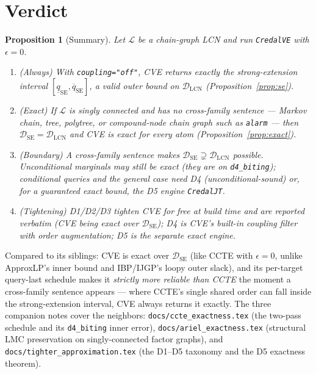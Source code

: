 \documentclass[11pt]{article}
\newtheorem{proposition}{Proposition}
\newcommand{\lo}{\underline}
\newcommand{\hi}{\overline}
\newcommand{\DSE}{\mathcal{D}_{\mathrm{SE}}}
\newcommand{\DLCN}{\mathcal{D}_{\mathrm{LCN}}}
\newcommand{\CVE}{\texttt{CredalVE}}
\begin{document}
\section{Verdict}\label{sec:verdict}

\begin{proposition}[Summary]\label{prop:verdict}
Let $\mathcal L$ be a chain-graph LCN and run \CVE{} with $\epsilon=0$.
\begin{enumerate}
  \item (\emph{Always}) With \texttt{coupling="off"}, CVE returns exactly the strong-extension
    interval $[\lo q_{\mathrm{SE}},\hi q_{\mathrm{SE}}]$, a valid outer bound on $\DLCN$
    (Proposition~\ref{prop:se}).
  \item (\emph{Exact}) If $\mathcal L$ is singly connected and has no cross-family sentence --- Markov
    chain, tree, polytree, or compound-node chain graph such as \texttt{alarm} --- then
    $\DSE=\DLCN$ and CVE is exact for every atom (Proposition~\ref{prop:exact}).
  \item (\emph{Boundary}) A cross-family sentence makes $\DSE\supsetneq\DLCN$ possible. Unconditional
    marginals may still be exact (they are on \texttt{d4\_biting}); conditional queries and the
    general case need D4 (unconditional-sound) or, for a guaranteed exact bound, the D5 engine
    \texttt{CredalJT}.
  \item (\emph{Tightening}) D1/D2/D3 tighten CVE for free at build time and are reported verbatim
    (CVE being exact over $\DSE$); D4 is CVE's built-in coupling filter with order augmentation; D5
    is the separate exact engine.
\end{enumerate}
\end{proposition}

\noindent Compared to its siblings: CVE is exact over $\DSE$ (like CCTE with $\epsilon=0$, unlike
ApproxLP's inner bound and IBP/IJGP's loopy outer slack), and its per-target query-last schedule
makes it \emph{strictly more reliable than CCTE} the moment a cross-family sentence appears --- where
CCTE's single shared order can fall inside the strong-extension interval, CVE always returns it
exactly. The three companion notes cover the neighbors: \texttt{docs/ccte\_exactness.tex} (the
two-pass schedule and its \texttt{d4\_biting} inner error), \texttt{docs/ariel\_exactness.tex}
(structural LMC preservation on singly-connected factor graphs), and
\texttt{docs/tighter\_approximation.tex} (the D1--D5 taxonomy and the D5 exactness theorem).
\end{document}

